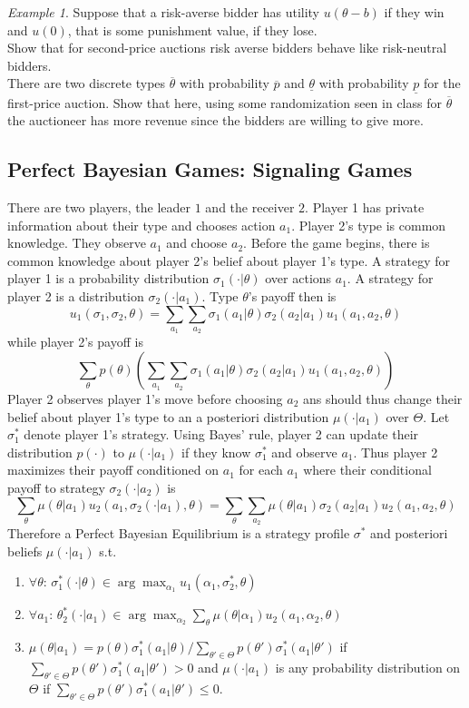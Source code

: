 \documentclass[a4paper, 12pt]{article}
\theoremstyle{plain}
\theoremstyle{definition}
\theoremstyle{lemma}
\theoremstyle{remark}
\theoremstyle{corollary}
\theoremstyle{example}
\newtheorem{example}[theorem]{Example}
\begin{document}
	\begin{example}
		Suppose that a risk-averse bidder has utility $u(\theta-b)$ if they win and $u(0)$, that is some punishment value, if they lose.\\
		Show that for second-price auctions risk averse bidders behave like risk-neutral bidders.\\
		There are two discrete types $\overline{\theta}$ with probability $\overline{p}$ and $\underline{\theta}$ with probability $\underline{p}$ for the first-price auction. Show that here, using some randomization seen in class for $\overline{\theta}$ the auctioneer has more revenue since the bidders are willing to give more.
	\end{example}
	\subsection{Perfect Bayesian Games: Signaling Games}
	There are two players, the leader $1$ and the receiver $2$. Player 1 has private information about their type and chooses action $a_1$. Player 2's type is common knowledge. They observe $a_1$ and choose $a_2$. Before the game begins, there is common knowledge about player 2's belief about player 1's type. A strategy for player 1 is a probability distribution $\sigma_1(\cdot |\theta)$ over actions $a_1$. A strategy for player 2 is a distribution $\sigma_2(\cdot | a_1)$. Type $\theta$'s payoff then is \[u_1(\sigma_1,\sigma_2,\theta) = \sum_{a_1}\sum_{a_2}\sigma_1(a_1|\theta)\sigma_2(a_2|a_1)u_1(a_1,a_2,\theta)\] while player 2's payoff is \[\sum_\theta p(\theta)\left(\sum_{a_1}\sum_{a_2}\sigma_1(a_1|\theta)\sigma_2(a_2|a_1)u_1(a_1,a_2,\theta)\right)\]
	Player 2 observes player 1's move before choosing $a_2$ ans should thus change their belief about player 1's type to an a posteriori distribution $\mu(\cdot | a_1)$ over $\Theta$. Let $\sigma_1^*$ denote player 1's strategy. Using Bayes' rule, player 2 can update their distribution $p(\cdot)$ to $\mu(\cdot | a_1)$ if they know $\sigma_1^*$ and observe $a_1$. Thus player 2 maximizes their payoff conditioned on $a_1$ for each $a_1$ where their conditional payoff to strategy $\sigma_2(\cdot | a_2)$ is \[\sum_\theta \mu(\theta|a_1)u_2(a_1,\sigma_2(\cdot | a_1),\theta) = \sum_\theta\sum_{a_2}\mu(\theta|a_1)\sigma_2(a_2|a_1)u_2(a_1,a_2,\theta)\] Therefore a Perfect Bayesian Equilibrium is a strategy profile $\sigma^*$ and posteriori beliefs $\mu(\cdot | a_1)$ s.t. \begin{enumerate}
		\item $\forall \theta$: $\sigma_1^*(\cdot | \theta) \in \arg\max_{\alpha_1} u_1(\alpha_1,\sigma_2^*,\theta)$
		\item $\forall a_1$: $\theta_2^*(\cdot | a_1) \in \arg \max_{\alpha_2} \sum_\theta \mu(\theta|\alpha_1)u_2(a_1,\alpha_2,\theta)$
		\item $\mu(\theta|a_1) = p(\theta)\sigma_1^*(a_1|\theta)/\sum_{\theta'\in \Theta} p(\theta')\sigma_1^*(a_1|\theta')$ if $\sum_{\theta' \in \Theta} p(\theta')\sigma_1^*(a_1|\theta') > 0$ and $\mu(\cdot |a_1)$ is any probability distribution on $\Theta$ if $\sum_{\theta' \in \Theta} p(\theta')\sigma_1^*(a_1|\theta') \leq 0$. 
	\end{enumerate}
\end{document}
